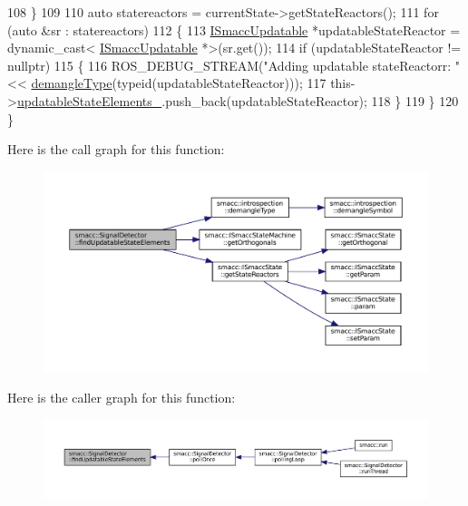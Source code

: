 \begin{DoxyCode}
108         \}
109 
110         \textcolor{keyword}{auto} statereactors = currentState->getStateReactors();
111         \textcolor{keywordflow}{for} (\textcolor{keyword}{auto} &sr : statereactors)
112         \{
113             \hyperlink{classISmaccUpdatable}{ISmaccUpdatable} *updatableStateReactor = \textcolor{keyword}{dynamic\_cast<}
      \hyperlink{classISmaccUpdatable}{ISmaccUpdatable} *\textcolor{keyword}{>}(sr.get());
114             \textcolor{keywordflow}{if} (updatableStateReactor != \textcolor{keyword}{nullptr})
115             \{
116                 ROS\_DEBUG\_STREAM(\textcolor{stringliteral}{"Adding updatable stateReactorr: "} << 
      \hyperlink{namespacesmacc_1_1introspection_a670e39ccea29952859df4e2d0e45077b}{demangleType}(\textcolor{keyword}{typeid}(updatableStateReactor)));
117                 this->\hyperlink{classsmacc_1_1SignalDetector_a07a5e7bb00c348435d954e22682fa610}{updatableStateElements\_}.push\_back(updatableStateReactor);
118             \}
119         \}
120     \}
\end{DoxyCode}
Here is the call graph for this function\+:
\nopagebreak
\begin{figure}[H]
\begin{center}
\leavevmode
\includegraphics[width=350pt]{classsmacc_1_1SignalDetector_a443234ebdf8cedd45cde725e64639dfe_cgraph}
\end{center}
\end{figure}
Here is the caller graph for this function\+:
\nopagebreak
\begin{figure}[H]
\begin{center}
\leavevmode
\includegraphics[width=350pt]{classsmacc_1_1SignalDetector_a443234ebdf8cedd45cde725e64639dfe_icgraph}
\end{center}
\end{figure}
\mbox{\label{classsmacc_1_1SignalDetector_a91ab3cd92d8095cdaf8610b50731f04b}} 
